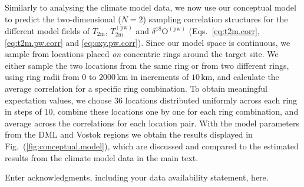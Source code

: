 \documentclass[draft]{agujournal2019}
\begin{document}
Similarly to analysing the climate model data, we now use our conceptual model
to predict the two-dimensional ($N=2$) sampling correlation structures for the
different model fields of $T_{\mathrm{2m}}$, $T_{\mathrm{2m}}^{\mathrm{(pw)}}$
and $\delta^{18}\mathrm{O}^{\mathrm{(pw)}}$ (Eqs.~\ref{eq:t2m.corr},
\ref{eq:t2m.pw.corr} and \ref{eq:oxy.pw.corr}). Since our model space is
continuous, we sample from locations placed \emph{on} concentric rings around
the target site. We either sample the two locations from the same ring or from
two different rings, using ring radii from $0$ to $2000$\,km in increments of
$10$\,km, and calculate the average correlation for a specific ring
combination. To obtain meaningful expectation values, we choose $36$ locations
distributed uniformly across each ring in steps of $10$\textdegree, combine
these locations one by one for each ring combination, and average across the
correlations for each location pair. With the model parameters from the DML and
Vostok regions we obtain the results displayed in
Fig.~(\ref{fig:conceptual.model}), which are discussed and compared to the
estimated results from the climate model data in the main text.

\acknowledgments
Enter acknowledgments, including your data availability statement, here.


\end{document}

